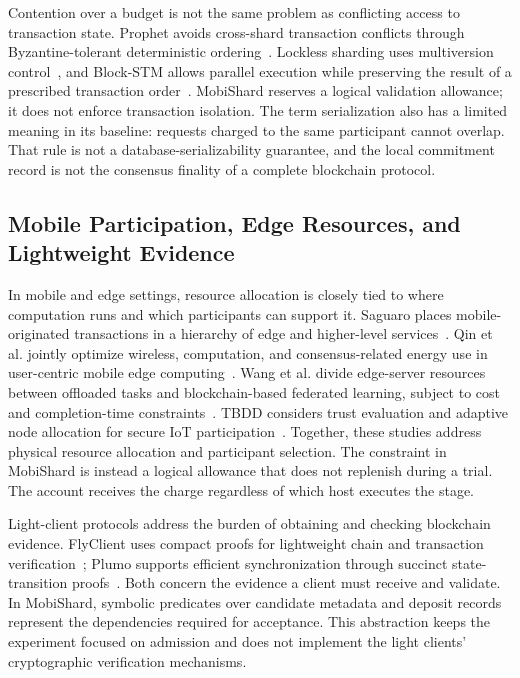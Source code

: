 Contention over a budget is not the same problem as conflicting access to
transaction state. Prophet avoids cross-shard transaction conflicts through
Byzantine-tolerant deterministic ordering~\cite{prophet}. Lockless sharding
uses multiversion control~\cite{lockless}, and Block-STM allows parallel
execution while preserving the result of a prescribed transaction
order~\cite{blockstm}. MobiShard reserves a logical validation allowance;
it does not enforce transaction isolation. The term serialization also has
a limited meaning in its baseline: requests charged to the same participant
cannot overlap. That rule is not a database-serializability guarantee, and
the local commitment record is not the consensus finality of a complete
blockchain protocol.

\subsection{Mobile Participation, Edge Resources, and Lightweight Evidence}

In mobile and edge settings, resource allocation is closely tied to where
computation runs and which participants can support it. Saguaro places
mobile-originated transactions in a hierarchy of edge and higher-level
services~\cite{saguaro}. Qin et al. jointly optimize wireless, computation,
and consensus-related energy use in user-centric mobile edge
computing~\cite{qin}. Wang et al. divide edge-server resources between offloaded
tasks and blockchain-based federated learning, subject to cost and
completion-time constraints~\cite{wang}. TBDD considers trust evaluation and
adaptive node allocation for secure IoT participation~\cite{tbdd}. Together,
these studies address physical resource allocation and participant selection.
The constraint in MobiShard is instead a logical allowance that does not
replenish during a trial. The account receives the charge regardless of
which host executes the stage.

Light-client protocols address the burden of obtaining and checking blockchain
evidence. FlyClient uses compact proofs for lightweight chain and transaction
verification~\cite{flyclient}; Plumo supports efficient synchronization through
succinct state-transition proofs~\cite{plumo}. Both concern the evidence a
client must receive and validate. In MobiShard, symbolic predicates over
candidate metadata and deposit records represent the dependencies required
for acceptance. This abstraction keeps the experiment focused on admission
and does not implement the light clients' cryptographic verification
mechanisms.

